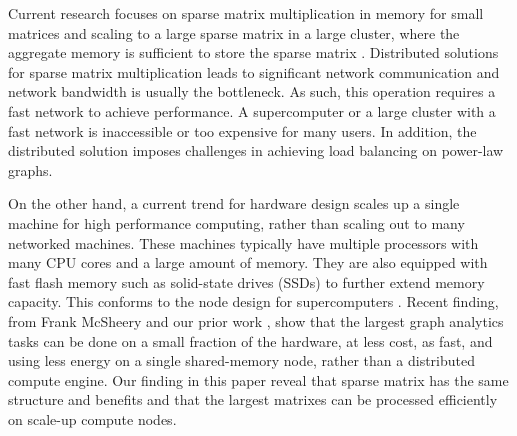 %




Current research focuses on sparse matrix multiplication in memory
for small matrices and scaling to a large sparse matrix in a large cluster,
where the aggregate memory is sufficient to store the sparse matrix
\cite{Williams07, Yoo11, Boman2013}.
Distributed solutions for sparse matrix multiplication leads to significant
network communication and network bandwidth is usually the bottleneck.
As such, this operation requires a fast network to achieve performance.
A supercomputer or a large cluster with a fast network is inaccessible or
too expensive for many users. In addition, the distributed solution imposes
challenges in achieving load balancing on power-law graphs.

On the other hand, a current trend for hardware design scales up
a single machine for high performance computing, rather than scaling out to 
many networked machines.
These machines typically have multiple processors with many CPU cores and
a large amount of memory. They are also equipped with fast flash
memory such as solid-state drives (SSDs) to further extend memory capacity.
This conforms to the node design for supercomputers \cite{Ang14}.
Recent finding, from Frank McSheery \cite{hotos,blog} and our prior work \cite{FlashGraph},
show that the largest graph analytics tasks can be done on a small fraction of
the hardware, at less cost, as fast, and using less energy on a single shared-memory 
node, rather than a distributed compute engine.  Our finding in this paper reveal
that sparse matrix has the same structure and benefits and that the largest 
matrixes can be processed efficiently on scale-up compute nodes.

